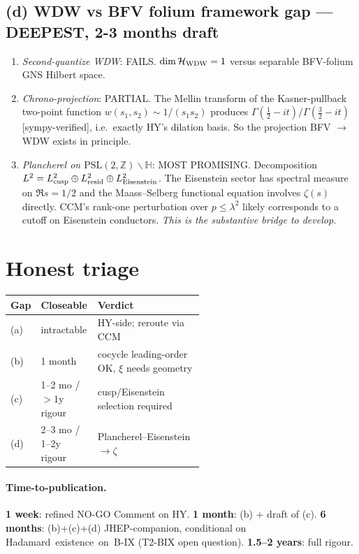 \documentclass[11pt]{article}
\begin{document}
\subsection*{(d) WDW vs BFV folium framework gap --- DEEPEST, 2-3 months draft}
\begin{enumerate}
\item \emph{Second-quantize WDW}: FAILS. \(\dim\mathcal H_{\rm WDW}=1\)
  versus separable BFV-folium GNS Hilbert space.
\item \emph{Chrono-projection}: PARTIAL. The Mellin transform of the
  Kasner-pullback two-point function \(w(s_1,s_2)\sim 1/(s_1 s_2)\)
  produces \(\Gamma(\tfrac12-it)/\Gamma(\tfrac32-it)\) [sympy-verified],
  i.e.\ exactly HY's dilation basis. So the projection BFV \(\to\) WDW
  exists in principle.
\item \emph{Plancherel on \(\mathrm{PSL}(2,\mathbb Z)\backslash\mathbb H\)}:
  MOST PROMISING. Decomposition
  \(L^2 = L^2_{\rm cusp}\oplus L^2_{\rm resid}\oplus L^2_{\rm Eisenstein}\).
  The Eisenstein sector has spectral measure on \(\Re s=1/2\) and the
  Maass--Selberg functional equation involves \(\zeta(s)\) directly. CCM's
  rank-one perturbation over \(p\le\lambda^2\) likely corresponds to a
  cutoff on Eisenstein conductors. \emph{This is the substantive bridge
  to develop.}
\end{enumerate}

\section{Honest triage}

\begin{center}\small
\begin{tabular}{l l p{0.55\linewidth}}
\toprule
Gap & Closeable & Verdict \\
\midrule
(a) & intractable & HY-side; reroute via CCM \\
(b) & 1 month & cocycle leading-order OK, \(\xi\) needs geometry \\
(c) & 1--2 mo / \(>1\)y rigour & cusp/Eisenstein selection required \\
(d) & 2--3 mo / 1--2y rigour & Plancherel--Eisenstein \(\to\zeta\) \\
\bottomrule
\end{tabular}
\end{center}

\paragraph{Time-to-publication.}
\textbf{1 week}: refined NO-GO Comment on HY.\quad
\textbf{1 month}: (b) + draft of (c).\quad
\textbf{6 months}: (b)+(c)+(d) JHEP-companion, conditional on
\hbox{Hadamard existence on B-IX} (T2-BIX open question).\quad
\textbf{1.5--2 years}: full rigour.
\end{document}
